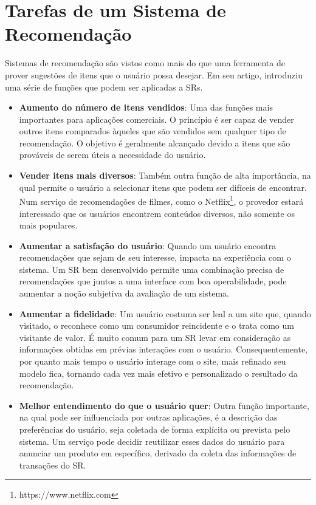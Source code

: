 \section{Tarefas de um Sistema de Recomendação}
\label{sec:tarefasSistemaRecomendacao}

Sistemas de recomendação são vistos como mais do que uma ferramenta de prover sugestões de itens que o usuário possa desejar. Em seu artigo, \cite{Ricci2011} introduziu uma série de funções que podem ser aplicadas a SRs.

\begin{itemize}
	\item{\textbf{Aumento do número de itens vendidos}: Uma das funções mais importantes para aplicações comerciais. O princípio é ser capaz de vender outros itens comparados àqueles que são vendidos sem qualquer tipo de recomendação. O objetivo é geralmente alcançado devido a itens que são prováveis de serem úteis a necessidade do usuário.}

	\item{\textbf{Vender itens mais diversos}: Também outra função de alta importância, na qual permite o usuário a selecionar itens que podem ser difíceis de encontrar. Num serviço de recomendações de filmes, como o Netflix\footnote{https://www.netflix.com}, o provedor estará interessado que os usuários encontrem conteúdos diversos, não somente os mais populares.}

	\item{\textbf{Aumentar a satisfação do usuário}: Quando um usuário encontra recomendações que sejam de seu interesse, impacta na experiência com o sistema. Um SR bem desenvolvido permite uma combinação precisa de recomendações que juntos a uma interface com boa operabilidade, pode aumentar a noção subjetiva da avaliação de um sistema.}

	\item{\textbf{Aumentar a fidelidade}: Um usuário costuma ser leal a um site que, quando visitado, o reconhece como um consumidor reincidente e o trata como um visitante de valor. É muito comum para um SR levar em consideração as informações obtidas em prévias interações com o usuário. Consequentemente, por quanto mais tempo o usuário interage com o site, mais refinado seu modelo fica, tornando cada vez mais efetivo e personalizado o resultado da recomendação.}

	\item{\textbf{Melhor entendimento do que o usuário quer}: Outra função importante, na qual pode ser influenciada por outras aplicações, é a descrição das preferências do usuário, seja coletada de forma explícita ou prevista pelo sistema. Um serviço pode decidir reutilizar esses dados do usuário para anunciar um produto em específico, derivado da coleta das informações de transações do SR.}
\end{itemize}

